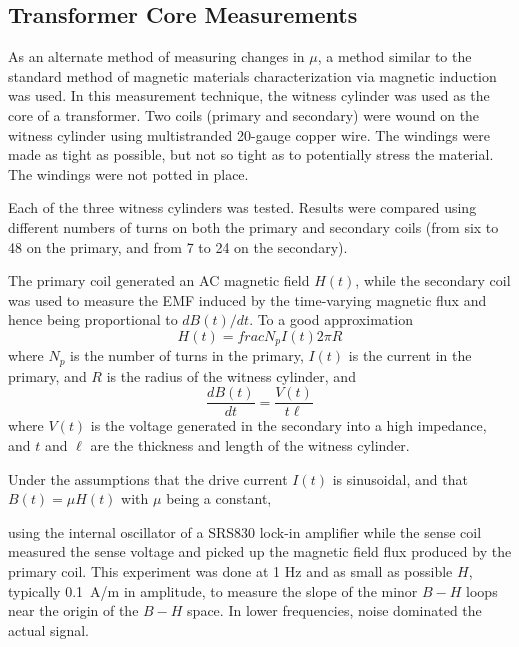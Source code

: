 
\subsection{Transformer Core Measurements}

As an alternate method of measuring changes in $\mu$, a method similar
to the standard method of magnetic materials characterization via
magnetic induction was used.  In this measurement technique, the
witness cylinder was used as the core of a transformer.  Two coils
(primary and secondary) were wound on the witness cylinder using
multistranded 20-gauge copper wire.  The windings were made as tight
as possible, but not so tight as to potentially stress the material.
The windings were not potted in place.

Each of the three witness cylinders was tested.  Results were compared
using different numbers of turns on both the primary and secondary
coils (from six to 48 on the primary, and from 7 to 24 on the
secondary).



The primary coil generated an AC magnetic field $H(t)$, while the
secondary coil was used to measure the EMF induced by the time-varying
magnetic flux and hence being proportional to $dB(t)/dt$.  To a good
approximation
\begin{equation}
H(t)=frac{N_pI(t)}{2\pi R}
\end{equation}
where $N_p$ is the number of turns in the primary, $I(t)$ is the
current in the primary, and $R$ is the radius of the witness cylinder,
and
\begin{equation}
\frac{dB(t)}{dt}=\frac{V(t)}{t\ell}
\end{equation}
where $V(t)$ is the voltage generated in the secondary into a high
impedance, and $t$ and $\ell$ are the thickness and length of the
witness cylinder.

Under the assumptions that the drive current $I(t)$ is sinusoidal, and
that $B(t)=\mu H(t)$ with $\mu$ being a constant, 


using the internal
oscillator of a SRS830 lock-in amplifier while the sense coil measured
the sense voltage and picked up the magnetic field flux produced by
the primary coil. This experiment was done at 1 Hz and as small as
possible $H$, typically 0.1~A/m in amplitude,
to measure the slope of the minor $B-H$ loops near the origin of the
$B-H$ space. In lower frequencies, noise dominated the actual signal.

